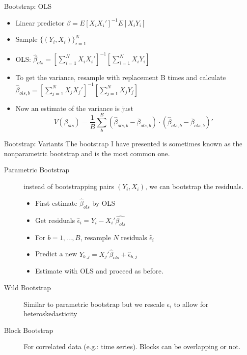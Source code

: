 \begin{frame}{Bootstrap: OLS}
 \begin{itemize}
 	\item Linear predictor $\beta = E[X_i X_i']^{-1}E[X_i Y_i] $
 	\item Sample $\{(Y_i,X_i) \}_{i=1}^{N}$  
 	\item OLS: $\hat \beta_{ols} = [\sum^N_{i=1} X_i X_i']^{-1}[\sum^N_{i=1} X_i Y_i] $
 	\item To get the variance, resample with replacement B times and calculate $\hat\beta_{ols,b}=   [\sum^N_{j=1} X_j X_j']^{-1}[\sum^N_{j=1} X_j Y_j] $
 	\item Now an estimate of the variance is just 
 	$$ V(\beta_{ols}) = \frac{1}{B}\sum_b^B (\hat \beta_{ols,b} - \bar \beta_{ols,b}) \cdot  (\hat \beta_{ols,b} - \bar \beta_{ols,b})' $$
 \end{itemize}
\end{frame}

\begin{frame}[allowframebreaks]{Bootstrap: Variants}
  The bootstrap I have presented is sometimes known as the \alert{nonparametric bootstrap} and is the most common one.
  \begin{description}
  \item[Parametric Bootstrap] instead of bootstrapping pairs $(Y_i,X_i)$, we can bootstrap the residuals. 
  \begin{itemize}
  	\item First estimate $\hat \beta_{ols}$ by OLS
  	\item Get residuals $\hat \epsilon_i = Y_i - X_i'\hat{\beta_{ols}}$ 
  	\item For $b=1,...,B$, resample $N$ residuals $\hat \epsilon_i$
  	\item Predict a new $Y_{b,j} = X_j' \hat \beta_{ols} + \hat \epsilon_{b,j}$
  	\item Estimate with OLS and proceed as before. 
  \end{itemize}
\framebreak

   \item[Wild Bootstrap] Similar to parametric bootstrap but we rescale $\epsilon_i$ to allow for \alert{heteroskedasticity}
  \item[Block Bootstrap] For correlated data (e.g.: time series). Blocks can be overlapping or not.  
  \end{description}
\end{frame}
  
